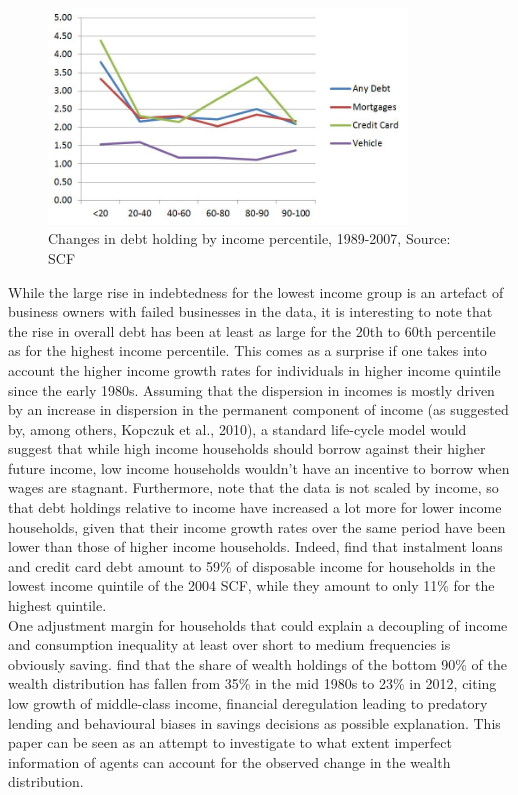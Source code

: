 \begin{figure}[ht]
	\centering
		\includegraphics[width=0.85\textwidth]{chg_debt_scf}
		\caption{Changes in debt holding by income percentile, 1989-2007, Source: SCF}
	\label{fig:chg_debt_scf}
\end{figure}

While the large rise in indebtedness for the lowest income group is an artefact of business owners with failed businesses in the data, it is interesting to note that the rise in overall debt has been at least as large for the 20th to 60th percentile as for the highest income percentile. This comes as a surprise if one takes into account the higher income growth rates for individuals in higher income quintile since the early 1980s. Assuming that the dispersion in incomes is mostly driven by an increase in dispersion in the permanent component of income (as suggested by, among others, Kopczuk et al., 2010), a standard life-cycle model would suggest that while high income households should borrow against their higher future income, low income households wouldn't have an incentive to borrow when wages are stagnant. Furthermore, note that the data is not scaled by income, so that debt holdings relative to income have increased a lot more for lower income households, given that their income growth rates over the same period have been lower than those of higher income households. Indeed, \citet{BarbaPivetti2009} find that instalment loans and credit card debt amount to 59\% of disposable income for households in the lowest income quintile of the 2004 SCF, while they amount to only 11\% for the highest quintile. \\
One adjustment margin for households that could explain a decoupling of income and consumption inequality at least over short to medium frequencies is obviously saving. \citet{SaezZucman2014} find that the share of wealth holdings of the bottom 90\% of the wealth distribution has fallen from 35\% in the mid 1980s to 23\% in 2012, citing low growth of middle-class income, financial deregulation leading to predatory lending and behavioural biases in savings decisions as possible explanation. This paper can be seen as an attempt to investigate to what extent imperfect information of agents can account for the observed change in the wealth distribution.  

